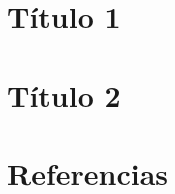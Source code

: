 \documentclass[oneside]{book}
\begin{document}


\setcounter{page}{1}

\chapter{Título 1} %


\chapter{Título 2}


\chapter*{Referencias}

\end{document}
